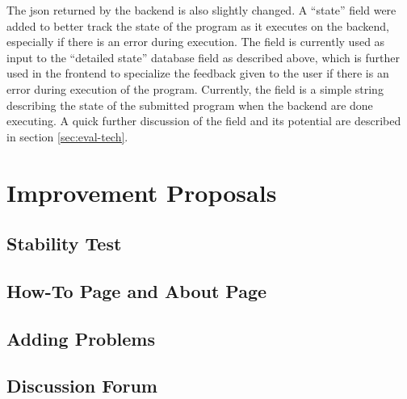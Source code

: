 The \gls{json} returned by the backend is also slightly changed. A ``state'' field were added to better track the state of the program as it executes on the backend, especially if there is an error during execution. The field is currently used as input to the ``detailed state'' database field as described above, which is further used in the frontend to specialize the feedback given to the user if there is an error during execution of the program. Currently, the field is a simple string describing the state of the submitted program when the backend are done executing. A quick further discussion of the field and its potential are described in section \ref{sec:eval-tech}.

\section{Improvement Proposals}

\subsection{Stability Test}

\subsection{How-To Page and About Page}

\subsection{Adding Problems}

\subsection{Discussion Forum}
